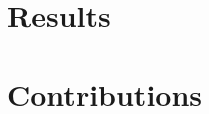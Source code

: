 \documentclass{article}
\begin{document}
\section{Results}

\section{Contributions}























\end{document}
